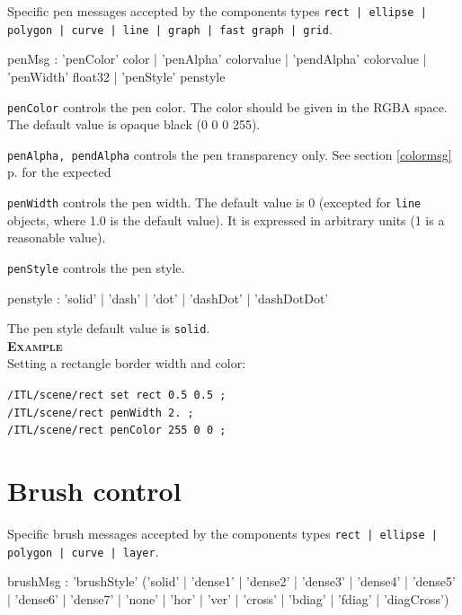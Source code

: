 \documentclass[a4paper,twoside]{report}
\newcommand{\sublevel}[1]	{\section{#1}}
\newcommand{\fullref}[1]	{\ref{#1} p.\pageref{#1}}
\newcommand{\OSC}[1]		{\texttt{#1}}
\newcommand{\example}		{\textbf{\hspace{-1.5cm}\textbf{\textsc{Example }}}}
\let\olditemize\itemize
\let\oldenditemize\enditemize
\renewenvironment{itemize} 	{\olditemize \setlength{\itemsep}{1mm}}{\oldenditemize}
\newcommand{\sample}	[1]			{\vspace{-2mm}\begin{center}\colorbox{mygrey}{
								\begin{minipage}[t]{0.9\columnwidth} 
								{\small \texttt{#1}}
								\end{minipage}}\end{center}}
\begin{document}
Specific pen messages accepted by the components types \OSC{rect | ellipse | polygon | curve | line | graph | fast graph | grid}.
\begin{rail}
penMsg : 	  'penColor' color 
			| 'penAlpha' colorvalue
			| 'pendAlpha' colorvalue
			| 'penWidth' float32
			| 'penStyle' penstyle
\end{rail}

\begin{itemize}
\item \OSC{penColor} controls the pen color. The color should be given in the RGBA space. The default value is opaque black (0 0 0 255).
\item \OSC{penAlpha, pendAlpha} controls the pen transparency only. See section \fullref{colormsg} for the expected \item \OSC{penWidth} controls the pen width. The default value is 0 (excepted for \OSC{line} objects, where 1.0 is the default value). It is expressed in arbitrary units (1 is a reasonable value).
\item \OSC{penStyle} controls the pen style.
 \end{itemize}


\begin{rail}
penstyle : 'solid' | 'dash' | 'dot' | 'dashDot' | 'dashDotDot'
\end{rail}

The pen style default value is \OSC{solid}.\\

\example \\
Setting a rectangle border width and color:
\sample{/ITL/scene/rect set rect 0.5 0.5 ;\\
/ITL/scene/rect penWidth 2. ;\\
/ITL/scene/rect penColor 255 0 0 ;  
}


\sublevel{Brush control}
\label{brush}
Specific brush messages accepted by the components types \OSC{rect | ellipse | polygon | curve |  layer}.
\begin{rail}
brushMsg : 	  'brushStyle' ('solid' | 'dense1' | 'dense2' | 'dense3' | 'dense4' | 'dense5' | 'dense6' | 'dense7' | 'none' | 'hor' | 'ver' | 'cross' | 'bdiag' | 'fdiag' | 'diagCross')
\end{rail}
\end{document}
